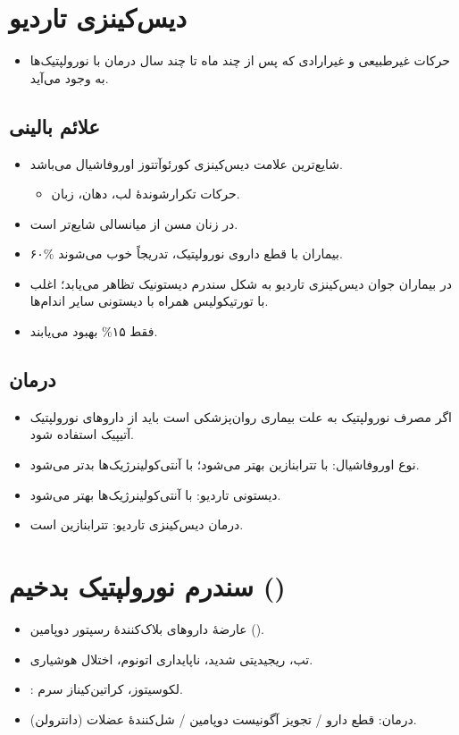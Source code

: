 \documentclass[a4paper,12pt]{extbook}
\begin{document}
\section*{دیس‌کینزی تاردیو}
\begin{itemize}
\item حرکات غیرطبیعی و غیرارادی که پس از چند ماه تا چند سال درمان با نورولپتیک‌ها به وجود می‌آید.
\end{itemize}
\subsection*{علائم بالینی}
\begin{itemize}
\item شایع‌ترین علامت دیس‌کینزی کورئوآتتوز اوروفاشیال می‌باشد.
\begin{itemize}
\item حرکات تکرارشوندهٔ لب، دهان، زبان.
\end{itemize}
\item در زنان مسن از میانسالی شایع‌تر است.
\item ۶۰\% بیماران با قطع داروی نورولپتیک، تدریجاً خوب می‌شوند.
\item در بیماران جوان دیس‌کینزی تاردیو به شکل سندرم دیستونیک تظاهر می‌یابد؛ اغلب با تورتیکولیس همراه با دیستونی سایر اندام‌ها.
\item فقط ۱۵\% بهبود می‌یابند.
\end{itemize}
\subsection*{درمان}
\begin{itemize}
\item اگر مصرف نورولپتیک به علت بیماری روان‌پزشکی است باید از داروهای نورولپتیک آتیپیک استفاده شود.
\item نوع اوروفاشیال: با تترا‌بنازین بهتر می‌شود؛ با آنتی‌کولینرژیک‌ها بدتر می‌شود.
\item دیستونی تاردیو: با آنتی‌کولینرژیک‌ها بهتر می‌شود.
\item درمان دیس‌کینزی تاردیو: تترا‌بنازین است.
\end{itemize}
\section*{سندرم نورولپتیک بدخیم ()}
\begin{itemize}
\item عارضهٔ داروهای بلاک‌کنندهٔ رسپتور دوپامین ().
\item تب، ریجیدیتی شدید، ناپایداری اتونوم، اختلال هوشیاری.
\item {}: لکوسیتوز، \MDen{$\uparrow$} کراتین‌کیناز سرم.
\item درمان: قطع دارو / تجویز آگونیست دوپامین / شل‌کنندهٔ عضلات (دانترولن).
\end{itemize}

\endgroup
\ifMotorStandalone\expandafter\enddocument\fi
\end{document}

